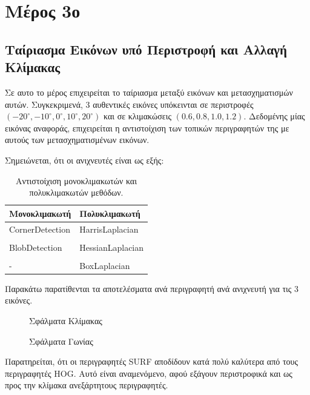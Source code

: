 \documentclass{article}
\newcommand{\eng}[1]{\foreignlanguage{english}{#1}}
\begin{document}
\section{Μέρος 3ο}

\subsection{Ταίριασμα Εικόνων υπό Περιστροφή και Αλλαγή Κλίμακας}

Σε αυτο το μέρος επιχειρείται το ταίριασμα μεταξύ εικόνων και μετασχηματισμών αυτών. Συγκεκριμενά, 3 αυθεντικές εικόνες υπόκεινται σε περιστροφές $(-20^{\circ}, -10^{\circ}, 0^{\circ}, 10^{\circ}, 20^{\circ})$ και σε κλιμακώσεις  $(0.6, 0.8, 1.0, 1.2)$. Δεδομένης μίας εικόνας αναφοράς, επιχειρείται η αντιστοίχιση των τοπικών περιγραφητών της με αυτούς των μετασχηματισμένων εικόνων.

Σημειώνεται, ότι οι ανιχνευτές είναι ως εξής:

\begin{table}[htbp]
  \centering
  \caption{Αντιστοίχιση μονοκλιμακωτών και πολυκλιμακωτών μεθόδων.}
    \begin{tabular}{l|l}
    \toprule
    Μονοκλιμακωτή & Πολυκλιμακωτή \\
    \midrule
    \eng{CornerDetection} & \eng{HarrisLaplacian} \\
                      &  \\
    \eng{BlobDetection}   & \eng{HessianLaplacian} \\
                      &  \\
    -   &  \eng{BoxLaplacian} \\
    \bottomrule
    \end{tabular}%
  \label{tab:mytable}%
\end{table}%

Παρακάτω παρατίθενται τα αποτελέσματα ανά περιγραφητή ανά ανιχνευτή για τις 3 εικόνες.

\begin{figure}[h]
    
    \caption{Σφάλματα Κλίμακας}
\end{figure}

\begin{figure}[h]
    
    \caption{Σφάλματα Γωνίας}
\end{figure}

Παρατηρείται, ότι οι περιγραφητές \eng{SURF} αποδίδουν κατά πολύ καλύτερα από τους περιγραφητές \eng{HOG}. Αυτό είναι αναμενόμενο, αφού εξάγουν περιστροφικά και ως προς την κλίμακα ανεξάρτητους περιγραφητές.
\end{document}
